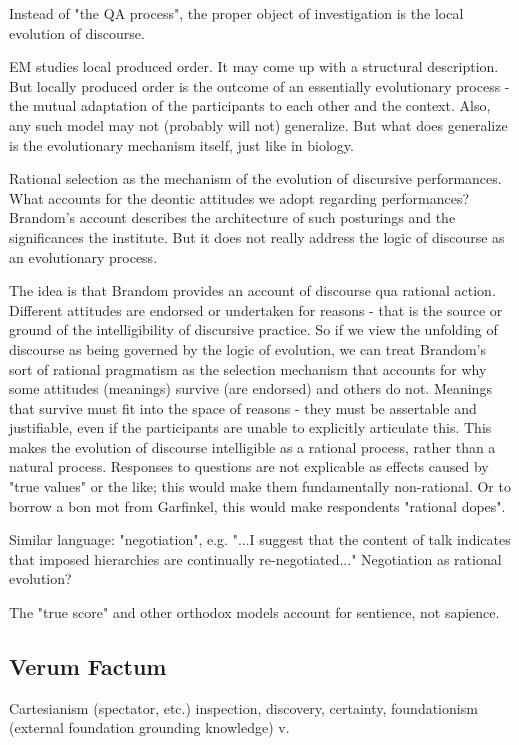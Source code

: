 \documentclass[11pt,twoside]{article}
\begin{document}
Instead of "the QA process", the proper object of investigation is the
local evolution of discourse.

EM studies local produced order.  It may come up with a structural
description.  But locally produced order is the outcome of an
essentially evolutionary process - the mutual adaptation of the
participants to each other and the context.  Also, any such model may
not (probably will not) generalize.  But what does generalize is the
evolutionary mechanism itself, just like in biology.

Rational selection as the mechanism of the evolution of discursive
performances.  What accounts for the deontic attitudes we adopt
regarding performances?  Brandom's account describes the architecture
of such posturings and the significances the institute.  But it does
not really address the logic of discourse as an evolutionary process.

The idea is that Brandom provides an account of discourse qua rational
action.  Different attitudes are endorsed or undertaken for reasons -
that is the source or ground of the intelligibility of discursive
practice.  So if we view the unfolding of discourse as being governed
by the logic of evolution, we can treat Brandom's sort of rational
pragmatism as the selection mechanism that accounts for why some
attitudes (meanings) survive (are endorsed) and others do not.
Meanings that survive must fit into the space of reasons - they must
be assertable and justifiable, even if the participants are unable to
explicitly articulate this.  This makes the evolution of discourse
intelligible as a rational process, rather than a natural process.
Responses to questions are not explicable as effects caused by "true
values" or the like; this would make them fundamentally non-rational.
Or to borrow a bon mot from Garfinkel, this would make respondents
"rational dopes".

Similar language: "negotiation", e.g. "...I suggest that the content
of talk indicates that imposed hierarchies are continually
re-negotiated..."  Negotiation as rational evolution?

The "true score" and other orthodox models account for sentience, not
sapience.

\subsection{Verum Factum}

Cartesianism (spectator, etc.) inspection, discovery, certainty,
foundationism (external foundation grounding knowledge) v.
\end{document}

